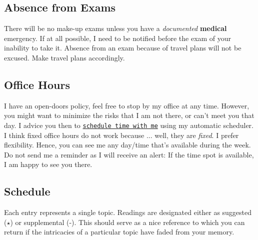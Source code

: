 \documentclass[letterpaper]{article}
\begin{document}
\subsection*{Absence from Exams}


There will be no make-up exams unless you have a \emph{documented} {\bf medical} emergency. If at all possible, I need to be notified before the exam of your inability to take it. Absence from an exam because of travel plans will not be excused. Make travel plans accordingly. 


\subsection*{Office Hours}

I have an open-doors policy, feel free to stop by my office at any time. However, you might want to minimize the risks that I am not there, or can't meet you that day. I advice you then to \href{https://calendly.com/bahamonde/officehours}{\texttt{schedule time with me}} using my automatic scheduler. I think fixed office hours do not work because ... well, they are \emph{fixed}. I prefer flexibility. Hence, you can see me any day/time that's available during the week. Do not send me a reminder as I will receive an alert: If the time spot is available, I am happy to see you there.



\subsection*{Schedule}


Each entry represents a single topic. Readings are designated either as suggested ($\star$) or supplemental (-). This should serve as a nice reference to which you can return if the intricacies of a particular topic have faded from your memory.
\end{document}
